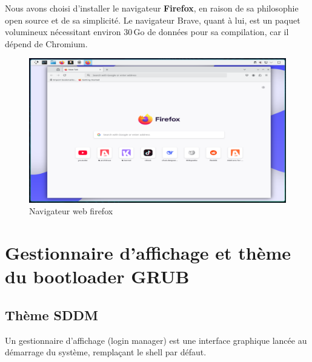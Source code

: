 Nous avons choisi d’installer le navigateur \textbf{Firefox}, en raison de sa philosophie open source et de sa simplicité.  
Le navigateur Brave, quant à lui, est un paquet volumineux nécessitant environ 30 Go de données pour sa compilation, car il dépend de Chromium.  
\begin{figure}[H]
  \centering
  \includegraphics[width=1\textwidth]{images_pfe/firefox.png}
  \caption{Navigateur web firefox}
  \label{fig:firefox-custom}
\end{figure}



 
\section{Gestionnaire d’affichage et thème du bootloader GRUB}
\label{subsec:sddm-theme}

\subsection{Thème SDDM}
Un gestionnaire d'affichage (login manager) est une interface graphique lancée au démarrage du système, remplaçant le shell par défaut. 

